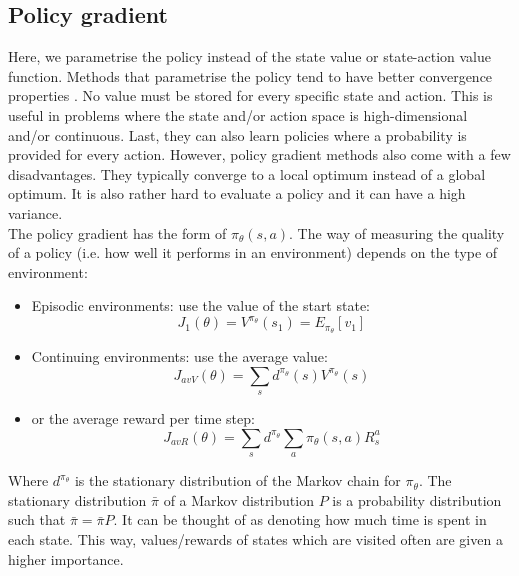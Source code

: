 \documentclass[a4paper, 11pt]{article}
\begin{document}
\subsection{Policy gradient}
\label{sub:rl_policy_gradient}

Here, we parametrise the policy instead of the state value or state-action value function.
Methods that parametrise the policy tend to have better convergence properties \citep{Sutton1999PolicyApproximation}.
No value must be stored for every specific state and action. This is useful in problems where the state and/or action space is high-dimensional and/or continuous. Last, they can also learn policies where a probability is provided for every action.
However, policy gradient methods also come with a few disadvantages. They typically converge to a local optimum instead of a global optimum. It is also rather hard to evaluate a policy and it can have a high variance.\\
The policy gradient has the form of $\pi_{\theta}(s,a)$. The way of measuring the quality of a policy (i.e. how well it performs in an environment) depends on the type of environment:
\begin{itemize}
\item Episodic environments: use the value of the start state:
        \begin{equation}
            J_1(\theta) = V^{\pi_{\theta}}(s_1) = E_{\pi_{\theta}} [v_1]
        \end{equation}
\item Continuing environments: use the average value:
        \begin{equation}
            J_{avV}(\theta) = \sum_s d^{\pi_{\theta}}(s)V^{\pi_{\theta}}(s)
        \end{equation}
\item or the average reward per time step:
        \begin{equation}
            J_{avR}(\theta) = \sum_s d^{\pi_{\theta}} \sum_a \pi_{\theta}(s,a) R_s^a
        \end{equation}
\end{itemize}
Where $d^{\pi_{\theta}}$ is the stationary distribution of the Markov chain for $\pi_{\theta}$. The stationary distribution $\bar{\pi}$ of a Markov distribution $P$ is a probability distribution such that $\bar{\pi} = \bar{\pi} P$. It can be thought of as denoting how much time is spent in each state. This way, values/rewards of states which are visited often are given a higher importance.\\
\end{document}
